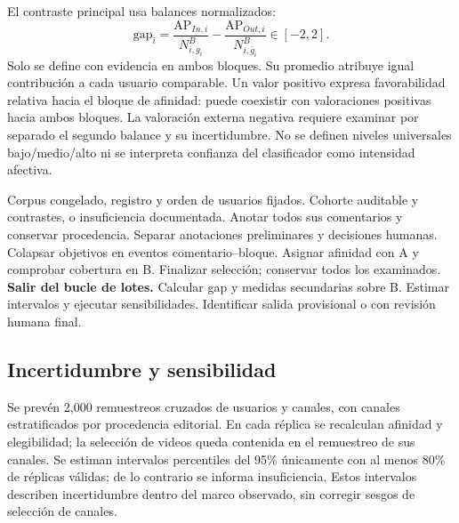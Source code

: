 \documentclass[conference,letterpaper]{IEEEtran}
\begin{document}
El contraste principal usa balances normalizados:
\begin{equation}
\mathrm{gap}_i=
\frac{\mathrm{AP}_{In,i}}{N^B_{i,g_i}}-
\frac{\mathrm{AP}_{Out,i}}{N^B_{i,\bar g_i}}\in[-2,2].
\label{eq:gap}
\end{equation}
Solo se define con evidencia en ambos bloques. Su promedio atribuye igual contribución a cada usuario comparable. Un valor positivo expresa favorabilidad relativa hacia el bloque de afinidad: puede coexistir con valoraciones positivas hacia ambos bloques. La valoración externa negativa requiere examinar por separado el segundo balance y su incertidumbre. No se definen niveles universales bajo/medio/alto ni se interpreta confianza del clasificador como intensidad afectiva.

\begin{algorithm}[t]
\caption{Selección y medición por usuario}
\label{alg:medicion}
\begin{algorithmic}[1]
\Require Corpus congelado, registro y orden de usuarios fijados.
\Ensure Cohorte auditable y contrastes, o insuficiencia documentada.
\State Anotar todos sus comentarios y conservar procedencia.
\State Separar anotaciones preliminares y decisiones humanas.
\State Colapsar objetivos en eventos comentario--bloque.
\State Asignar afinidad con A y comprobar cobertura en B.
\State Finalizar selección; conservar todos los examinados.
\State \textbf{Salir del bucle de lotes.}
\EndIf
\EndFor
\State Calcular gap y medidas secundarias sobre B.
\State Estimar intervalos y ejecutar sensibilidades.
\State Identificar salida provisional o con revisión humana final.
\end{algorithmic}
\end{algorithm}

\subsection{Incertidumbre y sensibilidad}
Se prevén 2,000 remuestreos cruzados de usuarios y canales, con canales estratificados por procedencia editorial. En cada réplica se recalculan afinidad y elegibilidad; la selección de videos queda contenida en el remuestreo de sus canales. Se estiman intervalos percentiles del 95\% únicamente con al menos 80\% de réplicas válidas; de lo contrario se informa insuficiencia. Estos intervalos describen incertidumbre dentro del marco observado, sin corregir sesgos de selección de canales.
\end{document}
